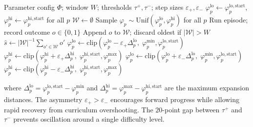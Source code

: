 \documentclass[letterpaper,10pt,journal]{IEEEtran}
\newcommand{\CDR}{\textsc{Cdr}\xspace}
\begin{document}
\begin{algorithm}[!t]
  \caption{Curriculum Domain Randomisation (\CDR)}
  \label{alg:cdr}
  \begin{algorithmic}[1]
    \Require Parameter config $\Phi$; window $W$;
             thresholds $\tau^+,\tau^-$;
             step sizes $\varepsilon_+,\varepsilon_-$
    \State $\varphi_p^\mathrm{lo}\!\gets\!\varphi_p^\mathrm{lo,start}$,\;
           $\varphi_p^\mathrm{hi}\!\gets\!\varphi_p^\mathrm{hi,start}$\;
           for all $p$
    \State $\mathcal{W}\gets\emptyset$
      \State Sample $\varphi_p\!\sim\!\mathrm{Unif}(\varphi_p^\mathrm{lo},\varphi_p^\mathrm{hi})$ for all $p$
      \State Run episode; record outcome $o\in\{0,1\}$
      \State Append $o$ to $\mathcal{W}$; discard oldest if $|\mathcal{W}|>W$
        \State $\hat{s}\gets|\mathcal{W}|^{-1}\sum_{o'\in\mathcal{W}}o'$
            \State $\varphi_p^\mathrm{lo}\!\gets\!
                   \mathrm{clip}(\varphi_p^\mathrm{lo}
                   {-}\varepsilon_+\Delta_p^\mathrm{lo},\;
                   \varphi_p^\mathrm{min},\varphi_p^\mathrm{lo,start})$
            \State $\varphi_p^\mathrm{hi}\!\gets\!
                   \mathrm{clip}(\varphi_p^\mathrm{hi}
                   {+}\varepsilon_+\Delta_p^\mathrm{hi},\;
                   \varphi_p^\mathrm{hi,start},\varphi_p^\mathrm{max})$
          \EndFor
            \State $\varphi_p^\mathrm{lo}\!\gets\!
                   \mathrm{clip}(\varphi_p^\mathrm{lo}
                   {+}\varepsilon_-\Delta_p^\mathrm{lo},\;
                   \varphi_p^\mathrm{min},\varphi_p^\mathrm{lo,start})$
            \State $\varphi_p^\mathrm{hi}\!\gets\!
                   \mathrm{clip}(\varphi_p^\mathrm{hi}
                   {-}\varepsilon_-\Delta_p^\mathrm{hi},\;
                   \varphi_p^\mathrm{hi,start},\varphi_p^\mathrm{max})$
          \EndFor
        \EndIf
      \EndIf
    \EndFor
  \end{algorithmic}
\end{algorithm}

where $\Delta_p^\mathrm{lo}=\varphi_p^\mathrm{lo,start}
-\varphi_p^\mathrm{min}$ and $\Delta_p^\mathrm{hi}=\varphi_p^\mathrm{max}
-\varphi_p^\mathrm{hi,start}$ are the maximum expansion distances.
The asymmetry $\varepsilon_+>\varepsilon_-$ encourages forward progress
while allowing rapid recovery from curriculum overshooting.
The $20$-point gap between $\tau^+$ and $\tau^-$ prevents oscillation
around a single difficulty level.
\end{document}
